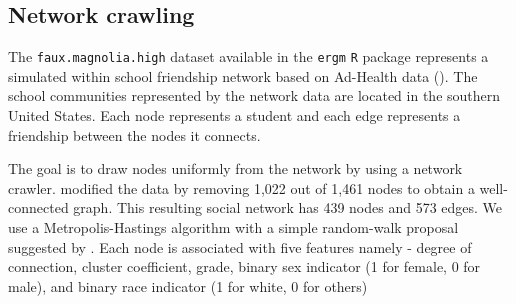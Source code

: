 \documentclass[11pt]{article}
\theoremstyle{remark}
\begin{document}

\subsection{Network crawling}


The \texttt{faux.magnolia.high} dataset available in the \texttt{ergm} \texttt{R} package represents a simulated within school friendship network based on Ad-Health data (\cite{resnick1997protecting}). The school communities represented by the network data are located in the southern United States. Each node represents a student and each edge represents a friendship between the nodes it connects.

The goal is to draw nodes uniformly from the network by using a network crawler. \cite{nilakanta2019ensuring} modified the data by removing 1,022 out of 1,461 nodes to obtain a well-connected graph. This resulting social network has 439 nodes and 573 edges. We use a Metropolis-Hastings algorithm with a simple random-walk  proposal suggested by \cite{gjoka2011practical}. Each node is associated with five features namely - degree of connection, cluster coefficient, grade, binary sex indicator (1 for female, 0 for male), and binary race indicator (1 for white, 0 for others)
\end{document}
